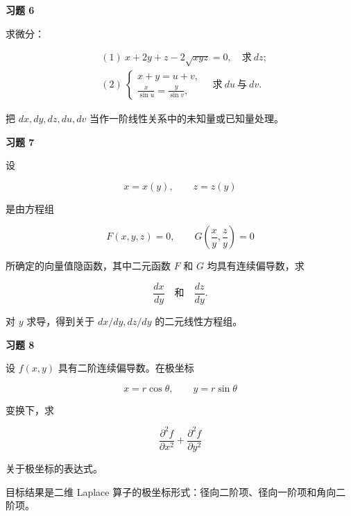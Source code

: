 \begin{exercisebox}
\textbf{习题 6}

求微分：

\[
      \begin{aligned}
      &(1)\ x+2y+z-2\sqrt{xyz}=0,\quad \text{求}\ dz;\\
      &(2)\ \begin{cases}
      x+y=u+v,\\
      \frac{x}{\sin u}=\frac{y}{\sin v},
      \end{cases}
      \quad \text{求}\ du\ \text{与}\ dv.
      \end{aligned}
      \]

\begin{hintbox}
把 \(dx,dy,dz,du,dv\) 当作一阶线性关系中的未知量或已知量处理。
\end{hintbox}
\end{exercisebox}

\begin{exercisebox}
\textbf{习题 7}

设

\[
        x=x(y),\qquad z=z(y)
      \]

是由方程组

\[
        F(x,y,z)=0,\qquad
        G\left(\frac{x}{y},\frac{z}{y}\right)=0
      \]

所确定的向量值隐函数，其中二元函数 \(F\) 和 \(G\) 均具有连续偏导数，求

\[
        \frac{dx}{dy}\quad \text{和}\quad \frac{dz}{dy}.
      \]

\begin{hintbox}
对 \(y\) 求导，得到关于 \(dx/dy,dz/dy\) 的二元线性方程组。
\end{hintbox}
\end{exercisebox}

\begin{exercisebox}
\textbf{习题 8}

设 \(f(x,y)\) 具有二阶连续偏导数。在极坐标

\[
        x=r\cos\theta,\qquad y=r\sin\theta
      \]

变换下，求

\[
        \frac{\partial^2 f}{\partial x^2}
        +
        \frac{\partial^2 f}{\partial y^2}
      \]

关于极坐标的表达式。

\begin{hintbox}
目标结果是二维 Laplace 算子的极坐标形式：径向二阶项、径向一阶项和角向二阶项。
\end{hintbox}
\end{exercisebox}

